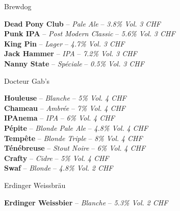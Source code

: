\documentclass{resume} %
\begin{document}
	\begin{rSection}{Brewdog}

	{\bf Dead Pony Club} – {\em Pale Ale } – {\em 3.8\% Vol.} \hfill {\em 3 CHF} \\

	{\bf Punk IPA} – {\em Post Modern Classic } – {\em 5.6\% Vol.} \hfill {\em 3 CHF} \\

	{\bf King Pin} – {\em Lager } – {\em 4.7\% Vol.} \hfill {\em 3 CHF} \\

	{\bf Jack Hammer} – {\em IPA } – {\em 7.2\% Vol.} \hfill {\em 3 CHF} \\

	{\bf Nanny State} – {\em Spéciale } – {\em 0.5\% Vol.} \hfill {\em 3 CHF} \\

	\end{rSection}

	\begin{rSection}{Docteur Gab's}

	{\bf Houleuse} – {\em Blanche } – {\em 5\% Vol.} \hfill {\em 4 CHF} \\

	{\bf Chameau} – {\em Ambrée } – {\em 7\% Vol.} \hfill {\em 4 CHF} \\

	{\bf IPAnema} – {\em IPA } – {\em 6\% Vol.} \hfill {\em 4 CHF} \\

	{\bf Pépite} – {\em Blonde Pale Ale } – {\em 4.8\% Vol.} \hfill {\em 4 CHF} \\

	{\bf Tempête} – {\em Blonde Triple } – {\em 8\% Vol.} \hfill {\em 4 CHF} \\

	{\bf Ténébreuse} – {\em Stout Noire } – {\em 6\% Vol.} \hfill {\em 4 CHF} \\

	{\bf Crafty} – {\em Cidre } – {\em 5\% Vol.} \hfill {\em 4 CHF} \\

	{\bf Swaf} – {\em Blonde } – {\em 4.8\% Vol.} \hfill {\em 2 CHF} \\

	\end{rSection}

	\begin{rSection}{Erdinger Weissbräu}

	{\bf Erdinger Weissbier} – {\em Blanche } – {\em 5.3\% Vol.} \hfill {\em 2 CHF} \\

	\end{rSection}
\end{document}
